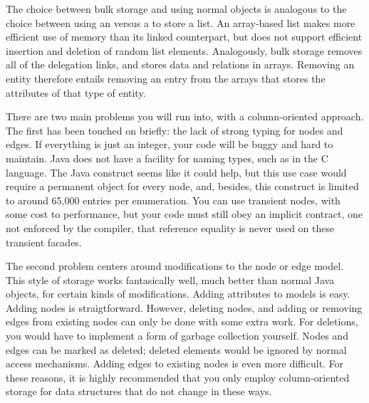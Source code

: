 The choice between bulk storage and using normal objects is analogous to the
choice between using an  versus a  to store a
list. An array-based list makes more efficient use of memory than its linked
counterpart, but does not support efficient insertion and deletion of random
list elements. Analogously, bulk storage removes all of the delegation links,
and stores data and relations in arrays. Removing an entity therefore entails
removing an entry from the arrays that stores the attributes of that type of
entity.

There are two main problems you will run into, with a column-oriented approach.
The first has been touched on briefly: the lack of strong typing for nodes and
edges. If everything is just an integer, your code will be buggy and hard to
maintain. Java does not have a facility for naming types, such as 
in the C language. The Java  construct seems like it could help, but
this use case would require a permanent object for every node, and, besides,
this construct is limited to around 65,000 entries per enumeration. You can use transient
nodes, with some cost to performance, but your code must still obey an implicit
contract, one not enforced by the  compiler, that reference equality
is never used on these transient facades.

The second problem centers around modifications to the node or edge model. This
style of storage works fantasically well, much better than normal Java objects,
for certain kinds of modifications. Adding attributes to models is easy.
Adding nodes is straigtforward. However, deleting nodes, and adding or
removing edges from existing nodes can only be done with some extra work. For
deletions, you would have to implement a form of garbage collection yourself.
Nodes and edges can be marked as deleted; deleted elements would be ignored by
normal access mechanisms. Adding edges to existing nodes is even more difficult.
For these reasons, it is highly recommended that you only employ column-oriented
storage for data structures that do not change in these ways.


 

